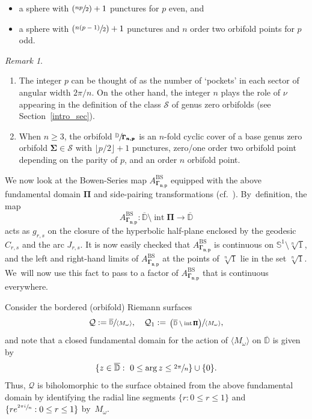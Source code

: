 \documentclass[10pt,a4paper]{amsart}
\newcommand{\cf}{cf.\ }
\newcommand{\skpt}{\par\smallskip}
\newcommand{\Psfrac}[2]{(\sfrac{#1}{#2})}
\let\faktor\sfrac
\theoremstyle{definition}
\theoremstyle{remark}
\newtheorem{remark}[lemma]{Remark}
\newcommand{\D}{\mathbb{D}}
\newcommand{\cS}{\mathcal{S}}
\DeclareMathOperator{\Int}{int}
\begin{document}
\begin{itemize}
\item
a sphere with $\Psfrac{np}{2}+1$ punctures for $p$ even, and

\item
a sphere with $\Psfrac{n(p-1)}{2}+1$ punctures and $n$ order two orbifold points for $p$ odd.
\end{itemize}

\skpt
\begin{remark}\label{reconcile_rem_1}
\begin{enumerate}
\item
The integer $p$ can be thought of as the number of `pockets' in each sector of angular width $2\pi/n$. On the other hand, the integer $n$ plays the role of $\nu$ appearing in the definition of the class $\cS$ of genus zero orbifolds (see Section~\ref{intro_sec}).

\item
When $n\geq 3$, the orbifold $\faktor{\D}{\pmb{\Gamma_{n,p}}}$ is an $n$-fold cyclic cover of a base genus zero orbifold $\pmb{\Sigma}\in\cS$ with $\lfloor p/2\rfloor +1$ punctures, zero/one order two orbifold point depending on the parity of $p$, and an order $n$ orbifold point.
\end{enumerate}
\end{remark}

We now look at the Bowen-Series map $A_{\pmb{\Gamma_{n,p}}}^{\mathrm{BS}}$ equipped with the above fundamental domain $\pmb{\Pi}$ and side-pairing transformations (\cf \cite{bowen_series}). By~definition, the map
\[
A_{\pmb{\Gamma_{n,p}}}^{\mathrm{BS}}:\overline{\D}\setminus\Int{\pmb{\Pi}}\to \overline{\D}
\]
acts as $g_{r,s}$ on the closure of the hyperbolic half-plane enclosed by the geodesic $C_{r,s}$ and the arc $J_{r,s}$.
It is now easily checked that $A_{\pmb{\Gamma_{n,p}}}^{\mathrm{BS}}$ is continuous on $\mathbb{S}^1\setminus\sqrt[n]{1}$, and the left and right-hand limits of $A_{\pmb{\Gamma_{n,p}}}^{\mathrm{BS}}$ at the points of $\sqrt[n]{1}$ lie in the set $\sqrt[n]{1}$. We~will now use this fact to pass to a factor of $A_{\pmb{\Gamma_{n,p}}}^{\mathrm{BS}}$ that is continuous everywhere.

Consider the bordered (orbifold) Riemann surfaces
\[
\mathcal{Q}:=\faktor{\overline{\D}}{\langle M_\omega\rangle},\quad \mathcal{Q}_1:=\faktor{\left(\overline{\D}\setminus \Int{\pmb{\Pi}}\right)}{\langle M_\omega\rangle},
\]
and note that a closed fundamental domain for the action of $\langle M_\omega \rangle$ on $\overline{\D}$ is given by
\[
\{z\in\overline{\D}:\ 0\leq\arg{z}\leq\sfrac{2\pi}{n}\}\cup\{0\}.
\]
Thus, $\mathcal{Q}$ is biholomorphic to the surface obtained from the above fundamental domain by identifying the radial line segments $\{r:0\leq r\leq 1\}$ and $\{re^{\sfrac{2\pi i}{n}}:0\leq r\leq 1\}$ by~$M_\omega$.
\end{document}
